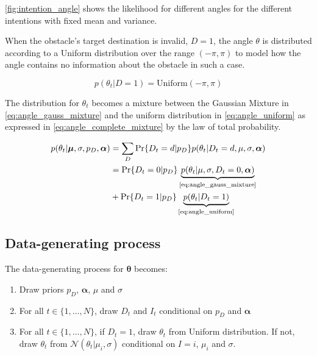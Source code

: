 \cref{fig:intention_angle} shows the likelihood for different angles for the different intentions with fixed mean and variance. 

When the obstacle's target destination is invalid, $D=1$, the angle $\theta$ is distributed according to a Uniform distribution over the range $(-\pi, \pi)$ to model how the angle contains no information about the obstacle in such a case. 

\begin{equation}\label{eq:angle_uniform}
    p(\theta_t | D=1) = \text{Uniform}(-\pi, \pi)
\end{equation}

The distribution for $\theta_t$ becomes a mixture between the Gaussian Mixture in \cref{eq:angle_gauss_mixture} and the uniform distribution in  \cref{eq:angle_uniform} as expressed in \cref{eq:angle_complete_mixture} by the law of total probability.

\begin{align}\label{eq:angle_complete_mixture}
\begin{split}
     p(\theta_t | \boldsymbol{\mu}, \sigma, p_D, \boldsymbol{\alpha})
     &= \sum_D \Pr\{D_t=d | p_D\} p(\theta_t | D_t=d, \mu, \sigma, \boldsymbol{\alpha})\\
     &= \Pr\{D_t = 0 | p_D\} \underbrace{p(\theta_t | \mu, \sigma, D_t=0, \boldsymbol{\alpha})}_{\text{\cref{eq:angle_gauss_mixture}}}\\
     &+ \Pr\{D_t=1 | p_D\}\underbrace{p(\theta_t | D_t=1)}_{\text{\cref{eq:angle_uniform}}}
\end{split}
\end{align}

\subsection{Data-generating process}
The data-generating process for $\boldsymbol{\theta}$ becomes:
\begin{enumerate}
    \item Draw priors $p_D$, $\boldsymbol{\alpha}$, $\mu$ and $\sigma$
    \item For all $t \in \{1, \dots, N \}$, draw $D_t$ and $I_t$ conditional on $p_D$ and $\boldsymbol{\alpha}$
    \item For all $t \in \{1, \dots, N\} $, if $D_t=1$, draw $\theta_t$ from Uniform distribution. If not, draw $\theta_t$ from $\mathcal{N}(\theta_t | \mu_i, \sigma)$ conditional on $I=i$, $\mu_i$ and $\sigma$. 
\end{enumerate}





